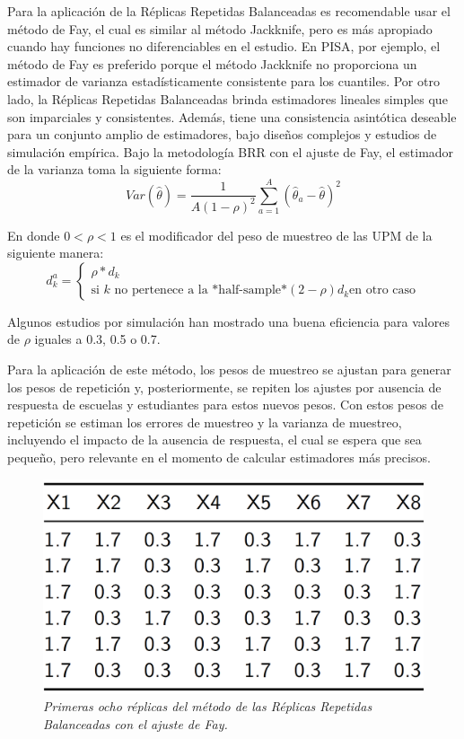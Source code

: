 Para la aplicación de la Réplicas Repetidas Balanceadas es recomendable usar el método de Fay, el cual es similar al método Jackknife, pero es más apropiado cuando hay funciones no diferenciables en el estudio. En PISA, por ejemplo, el método de Fay es preferido porque el método Jackknife no proporciona un estimador de varianza estadísticamente consistente para los cuantiles. Por otro lado, la Réplicas Repetidas Balanceadas brinda estimadores lineales simples que son imparciales y consistentes. Además, tiene una consistencia asintótica deseable para un conjunto amplio de estimadores, bajo diseños complejos y estudios de simulación empírica. Bajo la metodología BRR con el ajuste de Fay, el estimador de la varianza toma la siguiente forma:
\[
Var(\hat{\theta}) = \frac{1}{A(1-\rho)^2}\sum_{a=1}^A(\hat{\theta}_a - \hat\theta )^2
\]

En donde \(0<\rho<1\) es el modificador del peso de muestreo de las UPM de la siguiente manera:
\[
d_k^a=
\begin{cases}
\rho*d_k\\ \text{si $k$ no pertenece a la *half-sample*}
(2-\rho)d_k \text{en otro caso}
\end{cases}
\]

Algunos estudios por simulación han mostrado una buena eficiencia para valores de \(\rho\) iguales a 0.3, 0.5 o 0.7.

Para la aplicación de este método, los pesos de muestreo se ajustan para generar los pesos de repetición y, posteriormente, se repiten los ajustes por ausencia de respuesta de escuelas y estudiantes para estos nuevos pesos. Con estos pesos de repetición se estiman los errores de muestreo y la varianza de muestreo, incluyendo el impacto de la ausencia de respuesta, el cual se espera que sea pequeño, pero relevante en el momento de calcular estimadores más precisos.

\begin{figure}
\centering
\includegraphics{Pics/22.png}
\caption{\emph{Primeras ocho réplicas del método de las Réplicas Repetidas Balanceadas con el ajuste de Fay.}}
\end{figure}

